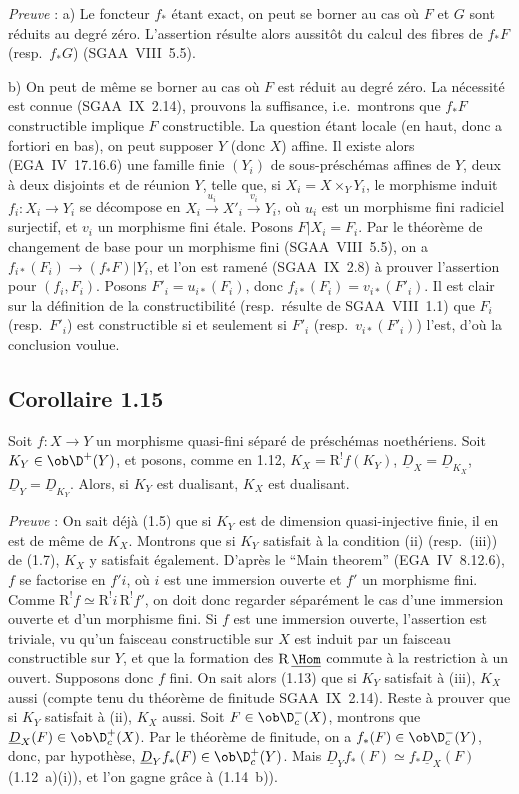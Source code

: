 \emph{Preuve} : a) Le foncteur $f_{*}$ étant exact, on peut se borner au cas où $F$ et $G$ sont réduits au degré zéro. L'assertion résulte alors aussitôt du calcul des fibres de $f_{*}F$ (resp.~$f_{*}G$) (SGAA~VIII~5.5).

b) On peut de même se borner au cas où $F$ est réduit au degré zéro. La nécessité est connue (SGAA~IX~2.14), prouvons la suffisance, i.e.~montrons que $f_{*}F$ constructible implique $F$ constructible. La question étant locale (en haut, donc a fortiori en bas), on peut supposer $Y$ (donc $X$) affine. Il existe alors (EGA~IV~17.16.6) une famille finie $(Y_i)$ de sous-préschémas affines de $Y$, deux à deux disjoints et de réunion $Y$, telle que, si $X_i = X \times_Y Y_i$, le morphisme induit $f_i : X_i \to Y_i$ se décompose en $X_i \xrightarrow{u_i} X'_i \xrightarrow{v_i} Y_i$, où $u_i$ est un morphisme fini radiciel surjectif, et $v_i$ un morphisme fini étale. Posons $F|X_i = F_i$. Par le théorème de changement de base pour un morphisme fini (SGAA~VIII~5.5), on a $f_{i*}(F_i) \to (f_{*}F)|Y_i$, et l'on est ramené (SGAA~IX~2.8) à prouver l'assertion pour $(f_i, F_i)$. Posons $F'_i = u_{i*}(F_i)$, donc $f_{i*}(F_i) = v_{i*}(F'_i)$. Il est clair sur la définition de la constructibilité (resp.~résulte de SGAA~VIII~1.1) que $F_i$ (resp.~$F'_i$) est constructible si et seulement si $F'_i$ (resp.~$v_{i*}(F'_i)$) l'est, d'où la conclusion voulue.

\subsection*{Corollaire 1.15}
Soit $f : X \to Y$ un morphisme quasi-fini séparé de préschémas noethériens. Soit $K_Y \in \ob \D^{+}(Y)$, et posons, comme en 1.12, $K_X = \mathrm{R}^{!}f(K_Y)$, $\underline{D}_X = \underline{D}_{K_X}$, $\underline{D}_Y = \underline{D}_{K_Y}$. Alors, si $K_Y$ est dualisant, $K_X$ est dualisant.

\emph{Preuve} : On sait déjà (1.5) que si $K_Y$ est de dimension quasi-injective finie, il en est de même de $K_X$. Montrons que si $K_Y$ satisfait à la condition (ii) (resp.~(iii)) de (1.7), $K_X$ y satisfait également. D'après le ``Main theorem'' (EGA~IV~8.12.6), $f$ se factorise en $f'i$, où $i$ est une immersion ouverte et $f'$ un morphisme fini. Comme $\mathrm{R}^{!}f \simeq \mathrm{R}^{!}i \, \mathrm{R}^{!}f'$, on doit donc regarder séparément le cas d'une immersion ouverte et d'un morphisme fini. Si $f$ est une immersion ouverte, l'assertion est triviale, vu qu'un faisceau constructible sur $X$ est induit par un faisceau constructible sur $Y$, et que la formation des $\mathrm{R}\,\underline{\Hom}$ commute à la restriction à un ouvert. Supposons donc $f$ fini. On sait alors (1.13) que si $K_Y$ satisfait à (iii), $K_X$ aussi (compte tenu du théorème de finitude SGAA~IX~2.14). Reste à prouver que si $K_Y$ satisfait à (ii), $K_X$ aussi. Soit $F \in \ob \D_c^{-}(X)$, montrons que $\underline{D}_X(F) \in \ob \D_c^{+}(X)$. Par le théorème de finitude, on a $f_{*}(F) \in \ob \D_c^{-}(Y)$, donc, par hypothèse, $\underline{D}_Y f_{*}(F) \in \ob \D_c^{+}(Y)$. Mais $\underline{D}_Y f_{*}(F) \simeq f_{*}\underline{D}_X(F)$ (1.12~a)(i)), et l'on gagne grâce à (1.14~b)).

